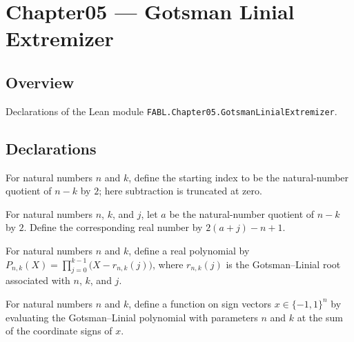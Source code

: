\chapter{Chapter05 — Gotsman Linial Extremizer}
\section{Overview}

Declarations of the Lean module \texttt{FABL.Chapter05.GotsmanLinialExtremizer}.

\section{Declarations}

\begin{definition}
\label{FABL.gotsmanLinialStart}
\leanok
For natural numbers $n$ and $k$, define the starting index to be the natural-number
quotient of $n-k$ by $2$; here subtraction is truncated at zero.
\end{definition}

\begin{definition}
\label{FABL.gotsmanLinialRoot}
\leanok
{}
For natural numbers $n$, $k$, and $j$, let $a$ be the natural-number quotient of $n-k$
by $2$. Define the corresponding real number by $2(a+j)-n+1$.
\end{definition}

\begin{definition}
\label{FABL.gotsmanLinialPolynomial}
\leanok
{}
For natural numbers $n$ and $k$, define a real polynomial by
$P_{n,k}(X)=\prod_{j=0}^{k-1}\bigl(X-r_{n,k}(j)\bigr)$, where $r_{n,k}(j)$ is the
Gotsman–Linial root associated with $n$, $k$, and $j$.
\end{definition}

\begin{definition}
\label{FABL.gotsmanLinialCubePolynomial}
\leanok
{}
For natural numbers $n$ and $k$, define a function on sign vectors $x\in\{-1,1\}^n$ by
evaluating the Gotsman–Linial polynomial with parameters $n$ and $k$ at the sum of the
coordinate signs of $x$.
\end{definition}

